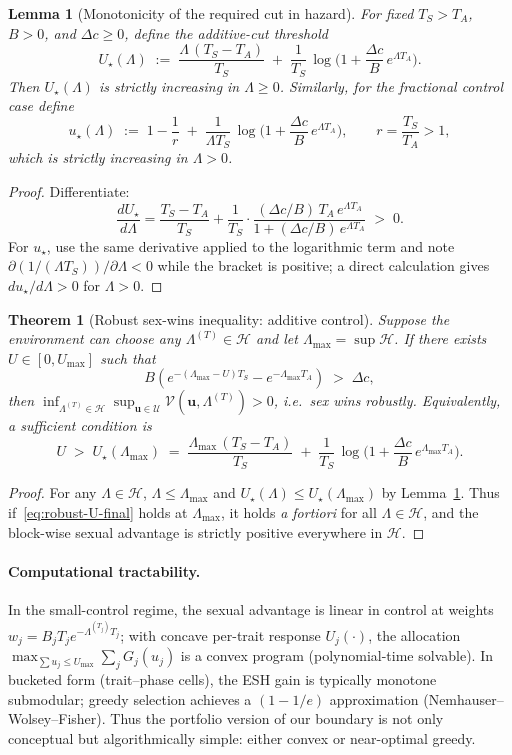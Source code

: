 \documentclass[11pt]{article}
\theoremstyle{upright}
\newtheorem{theorem}{Theorem}
\newtheorem{lemma}{Lemma}
\newcommand{\horizon}{\Lambda}
\newcommand{\Lmax}{\horizon^{(T)}_{\max}}
\newcommand{\Uset}{\mathcal{U}}
\newcommand{\Hset}{\mathcal{H}}
\newcommand{\hazT}[1]{\Lambda^{(#1)}}          %
\renewcommand{\Lmax}{\Lambda_{\max}}
\begin{document}
\begin{lemma}[Monotonicity of the required cut in hazard]\label{lem:mono}
For fixed $T_S>T_A$, $B>0$, and $\Delta c\ge 0$, define the additive-cut threshold
\[
U_\star(\Lambda) \;:=\; \frac{\Lambda\,(T_S-T_A)}{T_S} \;+\;
\frac{1}{T_S}\,\log\!\Big(1+\frac{\Delta c}{B}\,e^{\Lambda T_A}\Big).
\]
Then $U_\star(\Lambda)$ is strictly increasing in $\Lambda\ge 0$.
Similarly, for the fractional control case define
\[
u_\star(\Lambda) \;:=\; 1-\frac{1}{r} \;+\; \frac{1}{\Lambda T_S}\,\log\!\Big(1+\frac{\Delta c}{B}\,e^{\Lambda T_A}\Big),
\qquad r=\frac{T_S}{T_A}>1,
\]
which is strictly increasing in $\Lambda>0$.
\end{lemma}

\begin{proof}
Differentiate:
\[
\frac{d U_\star}{d\Lambda}
= \frac{T_S-T_A}{T_S} + \frac{1}{T_S}\cdot \frac{(\Delta c/B)\,T_A\,e^{\Lambda T_A}}{1+(\Delta c/B)\,e^{\Lambda T_A}}
\;>\; 0.
\]
For $u_\star$, use the same derivative applied to the logarithmic term and note $\partial(1/(\Lambda T_S))/\partial\Lambda<0$ while the bracket is positive; a direct calculation gives $du_\star/d\Lambda>0$ for $\Lambda>0$.
\end{proof}

\begin{theorem}[Robust sex-wins inequality: additive control]\label{thm:robust-add}
Suppose the environment can choose any $\hazT{T}\in\Hset$ and let $\Lmax=\sup\Hset$.
If there exists $U\in[0,U_{\max}]$ such that
\begin{equation}\label{eq:robust-U-final}
B\!\left(e^{-(\Lmax-U)T_S}-e^{-\Lmax T_A}\right) \;>\; \Delta c,
\end{equation}
then $\inf_{\hazT{T}\in\Hset}\sup_{\mathbf u\in\Uset} \mathcal V(\mathbf u,\hazT{T})>0$, i.e.\ sex wins robustly.
Equivalently, a sufficient condition is
\[
U \;>\; U_\star(\Lmax)
\;=\; \frac{\Lmax\,(T_S-T_A)}{T_S} \;+\; \frac{1}{T_S}\,\log\!\Big(1+\frac{\Delta c}{B}\,e^{\Lmax T_A}\Big).
\]
\end{theorem}

\begin{proof}
For any $\Lambda\in\Hset$, $\Lambda\le \Lmax$ and $U_\star(\Lambda)\le U_\star(\Lmax)$ by Lemma~\ref{lem:mono}.
Thus if~\eqref{eq:robust-U-final} holds at $\Lmax$, it holds \emph{a fortiori} for all $\Lambda\in\Hset$,
and the block-wise sexual advantage is strictly positive everywhere in $\Hset$.
\end{proof}

\paragraph{Computational tractability.}
In the small-control regime, the sexual advantage is linear in control at weights
$w_j=B_j T_j e^{-\Lambda^{(T_j)}T_j}$; with concave per-trait response $U_j(\cdot)$, the allocation
$\max_{\sum u_j\le U_{\max}}\sum_j G_j(u_j)$ is a convex program (polynomial-time solvable).
In bucketed form (trait–phase cells), the ESH gain is typically monotone submodular; greedy selection achieves a
$(1-1/e)$ approximation (Nemhauser–Wolsey–Fisher). Thus the portfolio version of our boundary is not only conceptual
but algorithmically simple: either convex or near-optimal greedy.
\end{document}
